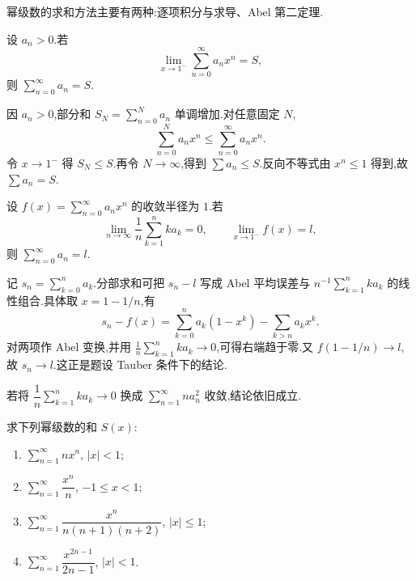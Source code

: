 幂级数的求和方法主要有两种:逐项积分与求导、Abel 第二定理.

\begin{example}
    设 $a_n>0$.若
    \[
        \lim\limits_{x\to1^-}\sum\limits_{n=0}^{\infty}a_nx^n=S,
    \]
    则 $\displaystyle\sum\limits_{n=0}^{\infty}a_n=S$.
\end{example}
\exampleblank

\begin{solution}
    因 $a_n>0$,部分和 $S_N=\sum_{n=0}^Na_n$ 单调增加.对任意固定 $N$,
    \[
        \sum\limits_{n=0}^Na_nx^n\leq\sum\limits_{n=0}^{\infty}a_nx^n.
    \]
    令 $x\to1^-$ 得 $S_N\leq S$.再令 $N\to\infty$,得到
    $\sum a_n\leq S$.反向不等式由 $x^n\leq1$ 得到,故 $\sum a_n=S$.
\end{solution}

\begin{example}
    设 $f(x)=\displaystyle\sum\limits_{n=0}^{\infty}a_nx^n$ 的收敛半径为 $1$.若
    \[
        \lim\limits_{n\to\infty}\dfrac{1}{n}\sum\limits_{k=1}^{n}ka_k=0,
        \qquad
        \lim\limits_{x\to1^-}f(x)=l,
    \]
    则 $\displaystyle\sum\limits_{n=0}^{\infty}a_n=l$.
\end{example}
\exampleblank

\begin{solution}
    记 $s_n=\sum_{k=0}^na_k$.分部求和可把 $s_n-l$ 写成 Abel 平均误差与
    $n^{-1}\sum_{k=1}^nka_k$ 的线性组合.具体取 $x=1-1/n$,有
    \[
        s_n-f(x)=\sum\limits_{k=0}^na_k(1-x^k)-\sum\limits_{k>n}a_kx^k.
    \]
    对两项作 Abel 变换,并用
    $\frac{1}{n}\sum_{k=1}^nka_k\to0$,可得右端趋于零.又 $f(1-1/n)\to l$,故 $s_n\to l$.这正是题设 Tauber 条件下的结论.
\end{solution}

\begin{remark}
    若将 $\displaystyle\dfrac{1}{n}\sum\limits_{k=1}^{n}ka_k\to0$ 换成 $\displaystyle\sum\limits_{n=1}^{\infty}na_n^2$ 收敛,结论依旧成立.
\end{remark}

\begin{example}
    求下列幂级数的和 $S(x)$:
    \begin{enumerate}
        \item $\displaystyle\sum\limits_{n=1}^{\infty}nx^n$, $|x|<1$;
        \item $\displaystyle\sum\limits_{n=1}^{\infty}\dfrac{x^n}{n}$, $-1\leq x<1$;
        \item $\displaystyle\sum\limits_{n=1}^{\infty}\dfrac{x^n}{n(n+1)(n+2)}$, $|x|\leq1$;
        \item $\displaystyle\sum\limits_{n=1}^{\infty}\dfrac{x^{2n-1}}{2n-1}$, $|x|<1$.
    \end{enumerate}
\end{example}
\exampleblank

